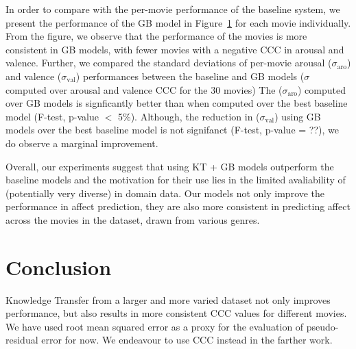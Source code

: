 \documentclass{article}
\begin{document}
In order to compare with the per-movie performance of the baseline system, we present the performance of the GB model in Figure~\ref{} for each movie individually.
From the figure, we observe that the performance of the movies is more consistent in GB models, with fewer movies with a negative CCC in arousal and valence.
Further, we compared the standard deviations of per-movie arousal ($\sigma_\text{aro}$) and valence ($\sigma_\text{val}$) performances between the baseline and GB models ($\sigma$ computed over arousal and valence CCC for the 30 movies) 
The ($\sigma_\text{aro}$) computed over GB models is signficantly better than when computed over the best baseline model (F-test, p-value $<$ 5\%). 
Although, the reduction in ($\sigma_\text{val}$) using GB models over the best baseline model is not signifanct (F-test, p-value = ??), we do observe a marginal improvement. 

Overall, our experiments suggest that using KT + GB models outperform the baseline models and the motivation for their use lies in the limited avaliability of (potentially very diverse) in domain data.
Our models not only improve the performance in affect prediction, they are also more consistent in predicting affect across the movies in the dataset, drawn from various genres.

\section{Conclusion}
Knowledge Transfer from a larger and more varied dataset not only improves performance, but also results in more consistent CCC values for different movies. We have used root mean squared error as a proxy for the evaluation of pseudo-residual error for now. We endeavour to use CCC instead in the farther work. 

\footnotesize{
\begin{spacing}{.85 }


\end{spacing}
}
\end{document}
